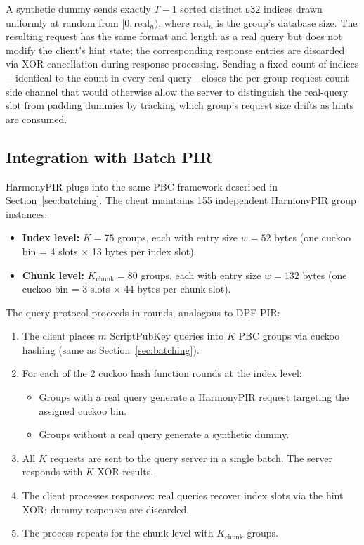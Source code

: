 A synthetic dummy sends exactly $T - 1$ sorted distinct $\mathsf{u32}$ indices drawn uniformly at random from $[0, \text{real}_n)$, where $\text{real}_n$ is the group's database size. The resulting request has the same format and length as a real query but does not modify the client's hint state; the corresponding response entries are discarded via XOR-cancellation during response processing. Sending a fixed count of indices---identical to the count in every real query---closes the per-group request-count side channel that would otherwise allow the server to distinguish the real-query slot from padding dummies by tracking which group's request size drifts as hints are consumed.

\subsection{Integration with Batch PIR}
\label{sec:harmony-batch}

HarmonyPIR plugs into the same PBC framework described in Section~\ref{sec:batching}. The client maintains 155 independent HarmonyPIR group instances:
\begin{itemize}[nolistsep,leftmargin=*]
    \item \textbf{Index level:} $K{=}75$ groups, each with entry size $w = 52$ bytes (one cuckoo bin = 4 slots $\times$ 13 bytes per index slot).
    \item \textbf{Chunk level:} $K_\text{chunk}{=}80$ groups, each with entry size $w = 132$ bytes (one cuckoo bin = 3 slots $\times$ 44 bytes per chunk slot).
\end{itemize}

The query protocol proceeds in rounds, analogous to DPF-PIR:
\begin{enumerate}[nolistsep,leftmargin=*]
    \item The client places $m$ ScriptPubKey queries into $K$ PBC groups via cuckoo hashing (same as Section~\ref{sec:batching}).
    \item For each of the 2 cuckoo hash function rounds at the index level:
    \begin{itemize}[nolistsep,leftmargin=*]
        \item Groups with a real query generate a HarmonyPIR request targeting the assigned cuckoo bin.
        \item Groups without a real query generate a synthetic dummy.
    \end{itemize}
    \item All $K$ requests are sent to the query server in a single batch. The server responds with $K$ XOR results.
    \item The client processes responses: real queries recover index slots via the hint XOR; dummy responses are discarded.
    \item The process repeats for the chunk level with $K_\text{chunk}$ groups.
\end{enumerate}


